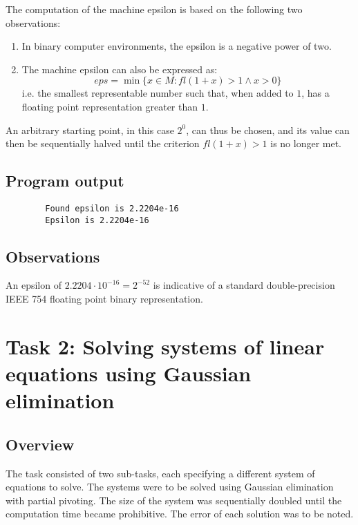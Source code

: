 \documentclass{article}
\begin{document}
	The computation of the machine epsilon is based on the following two
	observations:
	
	\begin{enumerate}
		\item In binary computer environments, the epsilon is a negative power
		of two.
		\item The machine epsilon can also be expressed as:
		\begin{equation}
			eps = \min\{x \in M: fl(1 + x) > 1 \land x > 0\}
		\end{equation}
		i.e. the smallest representable number such that, when added to $1$,
		has a floating point representation greater than $1$.
	\end{enumerate}
	
	An arbitrary starting point, in this case $2^0$, can thus be chosen, and its
	value can then be sequentially halved until the criterion $fl(1 + x) > 1$ is
	no longer met.
	
	\subsection{Program output}
	
	\begin{verbatim}
		Found epsilon is 2.2204e-16
		Epsilon is 2.2204e-16
	\end{verbatim}
	
	\subsection{Observations}
	
	An epsilon of $2.2204 \cdot 10^{-16} = 2^{-52}$ is indicative of a standard
	double-precision IEEE 754 floating point binary representation.
	
	\newpage
	
	\section{Task 2: Solving systems of linear equations using Gaussian
	elimination}
	
	\subsection{Overview}
	
	The task consisted of two sub-tasks, each specifying a different system
	of equations to solve. The systems were to be solved using Gaussian
	elimination with partial pivoting. The size of the system was sequentially
	doubled until the computation time became prohibitive. The error of each
	solution was to be noted.
	
\end{document}
